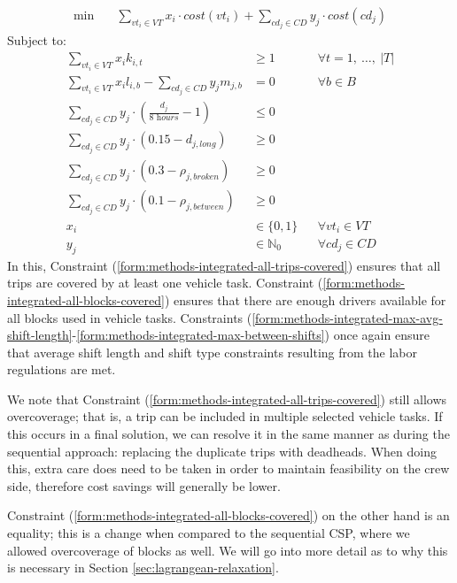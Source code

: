 \documentclass[]{article}
\begin{document}
\begin{align}
\min \quad
& \sum_{vt_i \in VT} x_{i} \cdot cost(vt_i) + \sum_{cd_j \in CD} y_{j} \cdot cost(cd_j)  
\end{align}
Subject to:
\begin{align}
\sum_{vt_i \in VT} x_{i}k_{i,t} &\geq 1 && \forall t = 1,\:\dots,\:|T| \label{form:methods-integrated-all-trips-covered} \\
\sum_{vt_i \in VT}x_i l_{i,b} - \sum_{cd_j \in CD}y_j m_{j,b} &= 0 && \forall b \in B \label{form:methods-integrated-all-blocks-covered} \\
\sum_{cd_j \in \textit{CD}} y_{j} \cdot (\frac{d_{j}}{\textit{8 hours}} - 1) &\leq 0 && \label{form:methods-integrated-max-avg-shift-length}\\
\sum_{cd_j \in \textit{CD}} y_{j} \cdot (0.15 - d_{j,\textit{long}}) &\geq 0 && \label{form:methods-integrated-max-long-shifts}\\
\sum_{cd_j \in \textit{CD}} y_{j} \cdot (0.3 - \rho_{j,\textit{broken}}) &\geq 0 && \label{form:methods-integrated-max-broken-shifts}\\
\sum_{cd_j \in \textit{CD}} y_{j} \cdot (0.1 - \rho_{j,\textit{between}}) &\geq 0 && \label{form:methods-integrated-max-between-shifts}\\
x_{i} &\in \{ 0, 1 \} && \forall vt_i \in VT \\
y_{j} &\in \mathbb{N}_0 && \forall cd_j \in CD
\end{align}
In this, Constraint (\ref{form:methods-integrated-all-trips-covered}) ensures that all trips are covered by at least one vehicle task. Constraint (\ref{form:methods-integrated-all-blocks-covered}) ensures that there are enough drivers available for all blocks used in vehicle tasks. Constraints (\ref{form:methods-integrated-max-avg-shift-length}-\ref{form:methods-integrated-max-between-shifts}) once again ensure that average shift length and shift type constraints resulting from the labor regulations are met. 

We note that Constraint (\ref{form:methods-integrated-all-trips-covered}) still allows overcoverage; that is, a trip can be included in multiple selected vehicle tasks. If this occurs in a final solution, we can resolve it in the same manner as during the sequential approach: replacing the duplicate trips with deadheads. When doing this, extra care does need to be taken in order to maintain feasibility on the crew side, therefore cost savings will generally be lower. 

Constraint (\ref{form:methods-integrated-all-blocks-covered}) on the other hand is an equality; this is a change when compared to the sequential CSP, where we allowed overcoverage of blocks as well. We will go into more detail as to why this is necessary in Section \ref{sec:lagrangean-relaxation}. 
\end{document}
